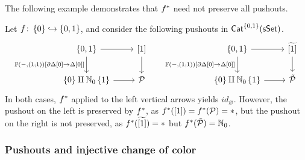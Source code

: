 \documentclass[a4paper,10pt
,draft
]{article}%
\renewcommand{\1}{\eta}%
\begin{document}
{  The following example demonstrates that $f^{\**}$ need not preserve all pushouts.
  \begin{example}
        Let $f \colon \left\{0\right\} \hookrightarrow \left\{0,1\right\}$, and consider the following pushouts in $\mathsf{Cat}^{\left\{0,1\right\}}(\mathsf{sSet})$.
        \[
              \begin{tikzcd}
                    \set{0,1} \arrow[d, "{\mathbb F(-, (1;1))[\partial \Delta[0] \to \Delta[0]]}"'] \arrow[r]
                    &
                    {[1]} \arrow[d]
                    &&& %
                    \set{0,1} \arrow[d, "{\mathbb F(-, (1;1))[\partial \Delta[0] \to \Delta[0]]}"'] \arrow[r]
                    &
                    \widetilde{[1]} \arrow[d]
                    \\
                    \set{0} \amalg \mathbb N_0\set{1} \arrow[r]
                    &
                    \mathcal P
                    &&& %
                    \set{0} \amalg \mathbb N_0\set{1} \arrow[r]
                    &
                    \tilde{\mathcal P}
              \end{tikzcd}
        \]
        In both cases, $f^{\**}$ applied to the left vertical arrows yields $id_{\varnothing}$.
        However, the pushout on the left is preserved by $f^{\**}$, as
        $f^{\**}([1]) = f^{\**}(\mathcal P) = \**$,
        but the pushout on the right is not preserved, as
        $f^{\**}(\widetilde{[1]}) = \**$ but $f^{\**}(\tilde{\mathcal P}) = \mathbb N_0$.

  \end{example}
} %



















\subsubsection{Pushouts and injective change of color}
\end{document}
